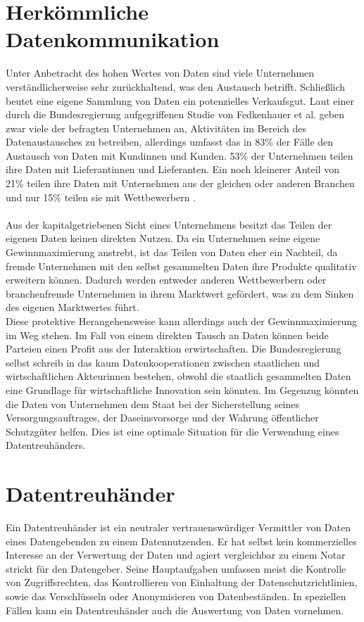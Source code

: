 \documentclass[11pt,a4paper]{scrreprt}
\begin{document}
\section{Herkömmliche Datenkommunikation}
Unter Anbetracht des hohen Wertes von Daten sind viele Unternehmen verständlicherweise sehr zurückhaltend, was den Austausch betrifft. Schließlich beutet eine eigene Sammlung von Daten ein potenzielles Verkaufsgut. Laut einer durch die Bundesregierung aufgegriffenen Studie von Fedkenhauer et al. geben zwar viele der befragten Unternehmen an, Aktivitäten im Bereich des Datenaustausches zu betreiben, allerdings umfasst das in 83\% der Fälle den Austausch von Daten mit Kundinnen und Kunden. 53\% der Unternehmen teilen ihre Daten mit Lieferantinnen und Lieferanten. Ein noch kleinerer Anteil von 21\% teilen ihre Daten mit Unternehmen aus der gleichen oder anderen Branchen und nur 15\% teilen sie mit Wettbewerbern \cite{dt-bundesregierung2021datenstrategie}. \\\\
Aus der kapitalgetriebenen Sicht eines Unternehmens besitzt das Teilen der eigenen Daten keinen direkten Nutzen. Da ein Unternehmen seine eigene Gewinnmaximierung anstrebt, ist das Teilen von Daten eher ein Nachteil, da fremde Unternehmen mit den selbst gesammelten Daten ihre Produkte qualitativ erweitern können. Dadurch werden entweder anderen Wettbewerbern oder branchenfremde Unternehmen in ihrem Marktwert gefördert, was zu dem Sinken des eigenen Marktwertes führt. \\
Diese protektive Herangehensweise kann allerdings auch der Gewinnmaximierung im Weg stehen. Im Fall von einem direkten Tausch an Daten können beide Parteien einen Profit aus der Interaktion erwirtschaften. Die Bundesregierung selbst schreib in \cite{dt-bundesregierung2021datenstrategie} das kaum Datenkooperationen zwischen staatlichen und wirtschaftlichen Akteurinnen bestehen, obwohl die staatlich gesammelten Daten eine Grundlage für wirtschaftliche Innovation sein könnten. Im Gegenzug könnten die Daten von Unternehmen dem Staat bei der Sicherstellung seines Versorgungsauftrages, der Daseinsvorsorge und der Wahrung öffentlicher Schutzgüter helfen. Dies ist eine optimale Situation für die Verwendung eines Datentreuhänders.
\section{Datentreuhänder}
\label{sec:dt}
Ein Datentreuhänder ist ein neutraler vertrauenswürdiger Vermittler von Daten eines Datengebenden zu einem Datennutzenden. Er hat selbst kein kommerzielles Interesse an der Verwertung der Daten und agiert vergleichbar zu einem Notar strickt für den Datengeber. Seine Hauptaufgaben umfassen meist die Kontrolle von Zugriffsrechten, das Kontrollieren von Einhaltung der Datenschutzrichtlinien, sowie das Verschlüsseln oder Anonymisieren von Datenbeständen. In speziellen Fällen kann ein Datentreuhänder auch die Auswertung von Daten vornehmen. \cite{dt-bundesregierung2021datenstrategie}\cite{dt-richter2020ddvtalk}
\end{document}
